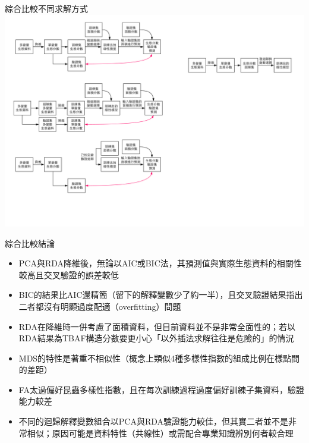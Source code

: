 \documentclass[10pt, aspectratio=1610, xcolor=table]{beamer}
\begin{document}
\begin{frame}{綜合比較不同求解方式}
\centering\includegraphics[width=1\textwidth]{diagram-綜合比較不同求解方式.pdf}

\end{frame}



\begin{frame}{綜合比較結論}
\begin{itemize}
	\item PCA與RDA降維後，無論以AIC或BIC法，其預測值與實際生態資料的相關性較高且交叉驗證的誤差較低
	\item BIC的結果比AIC還精簡（留下的解釋變數少了約一半），且交叉驗證結果指出二者都沒有明顯過度配適（overfitting）問題
	\item RDA在降維時一併考慮了面積資料，但目前資料並不是非常全面性的；若以RDA結果為TBAF構造分數要更小心「以外插法求解往往是危險的」的情況
	\item MDS的特性是著重不相似性（概念上類似4種多樣性指數的組成比例在樣點間的差距）
	\item FA太過偏好昆蟲多樣性指數，且在每次訓練過程過度偏好訓練子集資料，驗證能力較差
	\item 不同的迴歸解釋變數組合以PCA與RDA驗證能力較佳，但其實二者並不是非常相似；原因可能是資料特性（共線性）或需配合專業知識辨別何者較合理
\end{itemize}
\end{frame}
\end{document}

